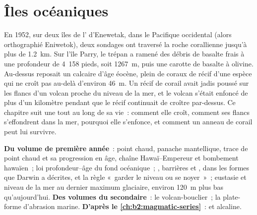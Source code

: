 \chapter{Îles océaniques}\label{ch:b2:oceanic-islands}

En 1952, sur deux îles de l' d'Enewetak, dans le Pacifique occidental (alors orthographié Eniwetok), deux
sondages ont traversé la roche corallienne jusqu'à plus de \qty{1.2}{km}. Sur l'île Parry, le trépan a ramené
des débris de basalte frais à une profondeur de 4~158 pieds, soit \qty{1267}{m}, puis une carotte de basalte
à olivine. Au-dessus reposait un calcaire d'âge éocène, plein de coraux de récif d'une espèce qui ne croît
pas au-delà d'environ \qty{46}{m}. Un récif de corail avait jadis poussé sur les flancs d'un volcan proche
du niveau de la mer, et le volcan s'était enfoncé de plus d'un kilomètre pendant que le récif continuait
de croître par-dessus. Ce chapitre suit une  tout au long de sa vie~: comment elle croît, comment
ses flancs s'effondrent dans la mer, pourquoi elle s'enfonce, et comment un anneau de corail peut lui survivre.

\begin{recall}
\textbf{Du volume de première année}~: point chaud, panache mantellique, trace de point chaud et sa
progression en âge, chaîne Hawaï--Empereur et bombement hawaïen~; loi profondeur--âge du fond océanique~;
, barrières et , dans les formes que Darwin a décrites, et la règle «~garder
le niveau ou se noyer~»~; eustasie et niveau de la mer au dernier maximum glaciaire, environ \qty{120}{m}
plus bas qu'aujourd'hui. \textbf{Des volumes du secondaire}~: le volcan-bouclier~; la plate-forme
d'abrasion marine. \textbf{D'après le \cref{ch:b2:magmatic-series}}~:  et alcaline.
\end{recall}


